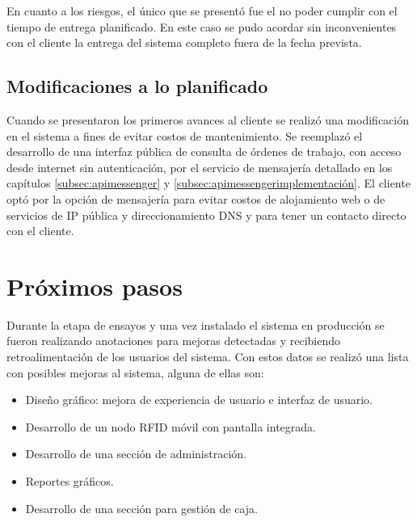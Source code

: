 En cuanto a los riesgos, el único que se presentó fue el no poder cumplir con el tiempo de entrega planificado. En este caso se pudo acordar sin inconvenientes con el cliente la entrega del sistema completo fuera de la fecha prevista. 

\subsection{Modificaciones a lo planificado}
Cuando se presentaron los primeros avances al cliente se realizó una modificación en el sistema a fines de evitar costos de mantenimiento. Se reemplazó el desarrollo de una interfaz pública de consulta de órdenes de trabajo, con acceso desde internet sin autenticación, por el servicio de mensajería detallado en los capítulos \ref{subsec:apimessenger} y \ref{subsec:apimessengerimplementación}. El cliente optó por la opción de mensajería para evitar costos de alojamiento web o de servicios de IP pública y direccionamiento DNS y para tener un contacto directo con el cliente. 



\section{Próximos pasos}

Durante la etapa de ensayos y una vez instalado el sistema en producción se fueron realizando anotaciones para mejoras detectadas y recibiendo retroalimentación de los usuarios del sistema. Con estos datos se realizó una lista con posibles mejoras al sistema, alguna de ellas son:

\begin{itemize}
\item Diseño gráfico: mejora de experiencia de usuario e interfaz de usuario.
\item Desarrollo de un nodo RFID móvil con pantalla integrada.
\item Desarrollo de una sección de administración.
\item Reportes gráficos.
\item Desarrollo de una sección para gestión de caja.
\end{itemize}
